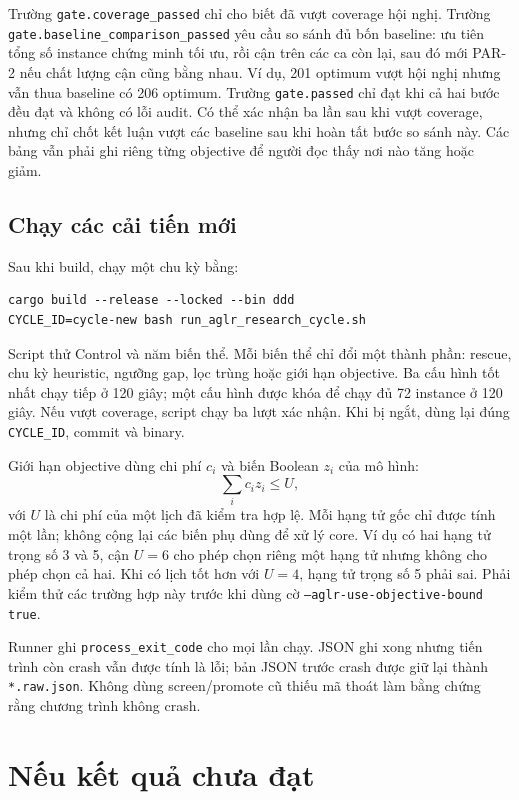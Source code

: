 \documentclass[11pt,a4paper]{article}
\newcommand{\code}[1]{\texttt{#1}}
\newcommand{\file}[1]{\nolinkurl{#1}}
\begin{document}
Trường \code{gate.coverage\_passed} chỉ cho biết đã vượt coverage hội nghị.
Trường \file{gate.baseline_comparison_passed} yêu cầu so sánh đủ bốn baseline:
ưu tiên tổng số instance chứng minh tối ưu, rồi cận trên các ca còn lại,
sau đó mới PAR-2 nếu chất lượng cận cũng bằng nhau.
Ví dụ, 201 optimum vượt hội nghị nhưng vẫn thua baseline có 206 optimum.
Trường \code{gate.passed} chỉ đạt khi cả hai bước đều đạt và không có lỗi
audit. Có thể xác nhận ba lần sau khi vượt coverage, nhưng chỉ chốt kết luận
vượt các baseline sau khi hoàn tất bước so sánh này. Các bảng vẫn phải ghi
riêng từng objective để người đọc thấy nơi nào tăng hoặc giảm.

\subsection{Chạy các cải tiến mới}

Sau khi build, chạy một chu kỳ bằng:

\begin{verbatim}
cargo build --release --locked --bin ddd
CYCLE_ID=cycle-new bash run_aglr_research_cycle.sh
\end{verbatim}

Script thử Control và năm biến thể. Mỗi biến thể chỉ đổi một thành phần:
rescue, chu kỳ heuristic, ngưỡng gap, lọc trùng hoặc giới hạn objective.
Ba cấu hình tốt nhất chạy tiếp ở 120 giây; một cấu hình được khóa để chạy
đủ 72 instance ở 120 giây. Nếu vượt coverage, script chạy ba lượt xác nhận.
Khi bị ngắt, dùng lại đúng \code{CYCLE\_ID}, commit và binary.

Giới hạn objective dùng chi phí $c_i$ và biến Boolean $z_i$ của mô hình:
\[
\sum_i c_i z_i \le U,
\]
với $U$ là chi phí của một lịch đã kiểm tra hợp lệ. Mỗi hạng tử gốc chỉ được
tính một lần; không cộng lại các biến phụ dùng để xử lý core. Ví dụ có hai
hạng tử trọng số 3 và 5, cận $U=6$ cho phép chọn riêng một hạng tử nhưng không
cho phép chọn cả hai. Khi có lịch tốt hơn với $U=4$, hạng tử trọng số 5 phải
sai. Phải kiểm thử các trường hợp này trước khi dùng cờ
\code{--aglr-use-objective-bound true}.

Runner ghi \code{process\_exit\_code} cho mọi lần chạy. JSON ghi xong nhưng
tiến trình còn crash vẫn được tính là lỗi; bản JSON trước crash được giữ lại
thành \code{*.raw.json}. Không dùng screen/promote cũ thiếu mã thoát làm bằng
chứng rằng chương trình không crash.

\section{Nếu kết quả chưa đạt}
\end{document}
